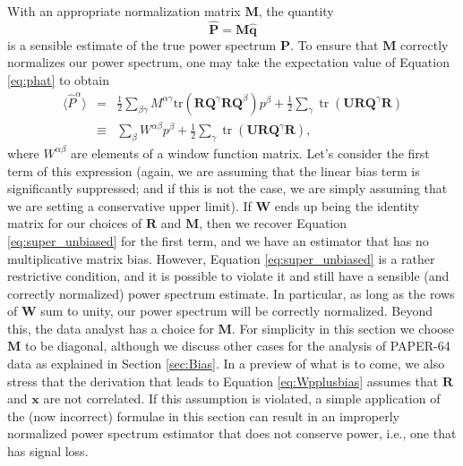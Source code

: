 \documentclass[preprint2,numberedappendix,tighten]{aastex6}  %
\DeclareMathOperator{\Tr}{tr}
\begin{document}
With an appropriate normalization matrix $\textbf{M}$, the quantity
\begin{equation}
\label{eq:phat}
\widehat{\textbf{P}} = \textbf{M}\widehat{\textbf{q}}
\end{equation}
is a sensible estimate of the true power spectrum $\textbf{P}$. To ensure that $\textbf{M}$ correctly normalizes our power spectrum, one may take the expectation value of Equation \eqref{eq:phat} to obtain
\begin{eqnarray}
\langle \widehat{P}^\alpha \rangle &=& \frac{1}{2} \sum_{\beta \gamma} M^{\alpha \gamma}  \textrm{tr} \left( \textbf{R}\textbf{Q}^{\gamma}\textbf{R} \textbf{Q}^{\beta}\right) p^\beta +\frac{1}{2} \sum_{ \gamma}  \Tr\left( \mathbf{U} \textbf{R} \textbf{Q}^{\gamma} \mathbf{R} \right) \nonumber \\
&\equiv & \sum_{\beta} W^{\alpha \beta} p^\beta +\frac{1}{2} \sum_{ \gamma}  \Tr\left( \mathbf{U} \textbf{R} \textbf{Q}^{\gamma} \mathbf{R} \right), \label{eq:Wpplusbias}
\end{eqnarray}
where $W^{\alpha \beta}$ are elements of a window function matrix. Let's consider the first term of this expression (again, we are assuming that the linear bias term is significantly suppressed; and if this is not the case, we are simply assuming that we are setting a conservative upper limit). If $\mathbf{W}$ ends up being the identity matrix for our choices of $\mathbf{R}$ and $\mathbf{M}$, then we recover Equation \eqref{eq:super_unbiased} for the first term, and we have an estimator that has no multiplicative matrix bias. However, Equation \eqref{eq:super_unbiased} is a rather restrictive condition, and it is possible to violate it and still have a sensible (and correctly normalized) power spectrum estimate. In particular, as long as the rows of $\mathbf{W}$ sum to unity, our power spectrum will be correctly normalized. Beyond this, the data analyst has a choice for $
\textbf{M}$. For simplicity in this section we choose $\textbf{M}$ to be diagonal, although we discuss other cases for the analysis 
of PAPER-64 data as explained in Section \ref{sec:Bias}. In a preview of what is to come, we also stress that the derivation that leads to Equation \eqref{eq:Wpplusbias} assumes that $\mathbf{R}$ and $\mathbf{x}$ are not correlated. If this assumption is violated, a simple application of the (now incorrect) formulae in this section can result in an improperly normalized power spectrum estimator that does not conserve power, i.e., one that has signal loss.
\end{document}
